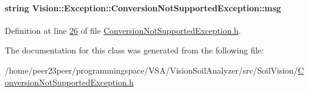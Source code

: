 \paragraph[{msg}]{\setlength{\rightskip}{0pt plus 5cm}string Vision\+::\+Exception\+::\+Conversion\+Not\+Supported\+Exception\+::msg\hspace{0.3cm}{\ttfamily [private]}}\label{class_vision_1_1_exception_1_1_conversion_not_supported_exception_a1cd5dd7edfb67cf5055374402b846daa}


Definition at line \hyperlink{_conversion_not_supported_exception_8h_source_l00026}{26} of file \hyperlink{_conversion_not_supported_exception_8h_source}{Conversion\+Not\+Supported\+Exception.\+h}.



The documentation for this class was generated from the following file\+:\begin{DoxyCompactItemize}
\item 
/home/peer23peer/programmingspace/\+V\+S\+A/\+Vision\+Soil\+Analyzer/src/\+Soil\+Vision/\hyperlink{_conversion_not_supported_exception_8h}{Conversion\+Not\+Supported\+Exception.\+h}\end{DoxyCompactItemize}
